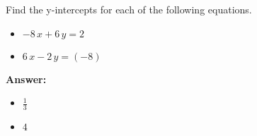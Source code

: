  Find the y-intercepts for each of the following equations. \begin{itemize}\item \( -8 \, x + 6 \, y = 2 \)\item \( 6 \, x - 2 \, y = \left(-8\right) \)\end{itemize}

        \textbf{Answer:} \begin{itemize}\item \( \frac{1}{3} \)\item \( 4 \)\end{itemize}
